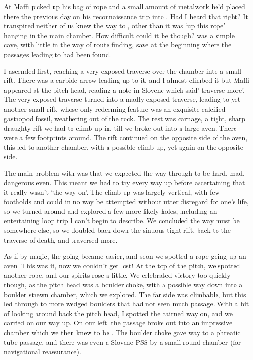 At  Maffi picked up his bag of rope and a small amount of metalwork he’d placed there the previous day on his reconnaissance trip into . Had I heard that right? It transpired neither of us knew the way to , other than it was ‘up this rope’ hanging in the main chamber. How difficult could it be though?  was a simple cave, with little in the way of route finding, save at the beginning where the passages leading to  had been found.

I ascended first, reaching a very exposed traverse over the chamber into a small rift. There was a carbide arrow leading up to it, and I almost climbed it but Maffi appeared at the pitch head, reading a note in Slovene which said’ traverse more’. The very exposed traverse turned into a madly exposed traverse, leading to yet another small rift, whose only redeeming feature was an exquisite calcified gastropod fossil, weathering out of the rock. The rest was carnage, a tight, sharp draughty rift we had to climb up in, till we broke out into a large aven. There were a few footprints around. The rift continued on the opposite side of the aven, this led to another chamber, with a possible climb up, yet again on the opposite side.

The main problem with  was that we expected the way through to be hard, mad, dangerous even. This meant we had to try every way up before ascertaining that it really wasn’t ‘the way on’. The climb up was largely vertical, with few footholds and could in no way be attempted without utter disregard for one’s life, so we turned around and explored a few more likely holes, including an entertaining loop trip I can’t begin to describe. We concluded the way must be somewhere else, so we doubled back down the sinuous tight rift, back to the traverse of death, and traversed more.

As if by magic, the going became easier, and soon we spotted a rope going up an aven. This was it, now we couldn’t get lost! At the top of the pitch, we spotted another rope, and our spirits rose a little. We celebrated victory too quickly though, as the pitch head was a boulder choke, with a possible way down into a boulder strewn  chamber, which we explored. The far side was climbable, but this led through to more wedged boulders that had not seen much passage. With a bit of looking around back the pitch head, I spotted the cairned way on, and we carried on our way up. On our left, the passage broke out into an impressive chamber which we then knew to be . The boulder choke gave way to a phreatic tube passage, and there was even a Slovene PSS by a small round chamber (for navigational reassurance). 

